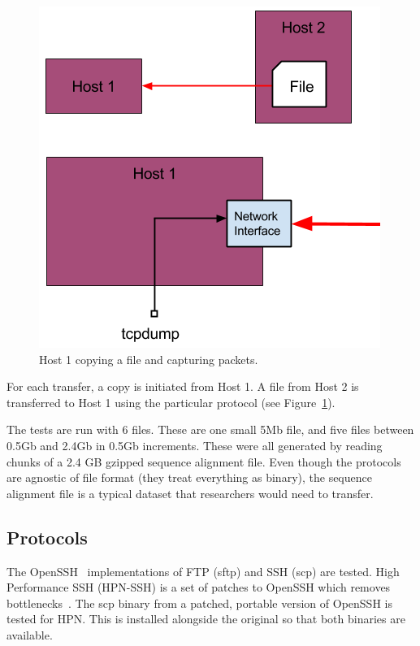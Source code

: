 \documentclass{sig-alternate-05-2015}
\begin{document}
\begin{figure}[t]
\centering
\includegraphics[width=\linewidth]{img/transfer_example.png}
\caption{Host 1 copying a file and capturing packets.\label{fig:copy_example}}
\end{figure}
For each transfer, a copy is initiated from Host 1. A file from Host 2 is transferred to Host 1 using the particular protocol (see Figure~\ref{fig:copy_example}).

The tests are run with 6 files. These are one small 5Mb file, and five files between 0.5Gb and 2.4Gb in 0.5Gb increments. These were all generated by reading chunks of a 2.4 GB gzipped sequence alignment file. Even though the protocols are agnostic of file format (they treat everything as binary), the sequence alignment file is a typical dataset that researchers would need to transfer.

\subsection{Protocols}
The OpenSSH~\cite{openssh} implementations of FTP (sftp) and SSH (scp) are tested. High Performance SSH (HPN-SSH) is a set of patches to OpenSSH which removes bottlenecks~\cite{rapier2008high}. The scp binary from a patched, portable version of OpenSSH is tested for HPN\@. This is installed alongside the original so that both binaries are available.
\end{document}
